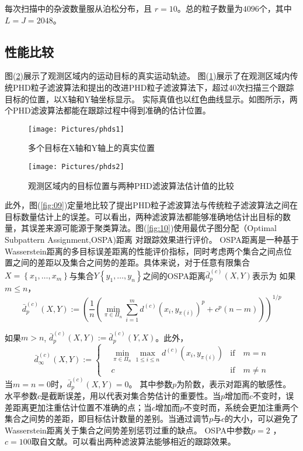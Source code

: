 每次扫描中的杂波数量服从泊松分布，且 $r=10$。总的粒子数量为$4096$个，其中$L=J=2048$。

\subsection{性能比较}
图(\ref{fig:07})展示了观测区域内的运动目标的真实运动轨迹。
图(\ref{fig:06})展示了在观测区域内传统PHD粒子滤波算法和提出的改进PHD粒子滤波算法下，超过40次扫描三个跟踪目标的位置，以X轴和Y轴坐标显示。 实际真值也以红色曲线显示。如图所示，两个PHD滤波算法都能在跟踪过程中得到准确的估计位置。

\begin{figure}[htbp]
	\centering
	\texttt{[image: Pictures/phds1]}
	\caption{多个目标在X轴和Y轴上的真实位置}
	\label{fig:06}
\end{figure}
	
\begin{figure}[htbp]
	\centering
	\texttt{[image: Pictures/phds2]}
	\caption{观测区域内的目标位置与两种PHD滤波算法估计值的比较}
	\label{fig:07}
\end{figure}

此外，图(\ref{fig:09})定量地比较了提出PHD粒子滤波算法与传统粒子滤波算法之间在目标数量估计上的误差。可以看出，两种滤波算法都能够准确地估计出目标的数量，其误差来源可能源于聚类算法。图(\ref{fig:10})使用最优子图分配（Optimal Subpattern Assignment,OSPA)距离\cite{schuhmacher2008consistent} 对跟踪效果进行评价。
OSPA距离是一种基于Wasserstein距离\cite{vallender1974calculation}的多目标误差距离的性能评价指标，同时考虑两个集合之间点位置之间的差距以及集合之间势的差距。具体来说，对于任意有限集合$X=\left\{x_1,\dots,x_m\right\}$与集合$Y\left\{y_1,\dots,y_n\right\}$之间的OSPA距离$\bar{d}^{(c)}_p(X,Y)$表示为
如果$m\leq n$，
\begin{equation}\label{OSPA1}
  \bar{d}^{(c)}_p(X,Y):=\left(\frac{1}{n}\left(\min\limits_{\pi \in \Pi _n}\sum_{i=1}^{m}d^{(c)}(x_i,y_{\pi(i)})^p+c^p(n-m)\right)\right)^{1/p}
\end{equation}

如果$m > n$, $  \bar{d}^{(c)}_p(X,Y):=   \bar{d}^{(c)}_p(Y,X)$。此外，
\begin{equation}\label{OSPA2}
 \bar{d}_{\infty}^{(c)}(X,Y):=\left\{
\begin{aligned}
 & \min\limits_{\pi \in \Pi_n}\max\limits_{1\leq i \leq n}d^{(c)}\left(x_i,y_{\pi(i)}\right) & \text{if} \quad m=n  \\
  & c & \text{if} \quad m\neq n
\end{aligned}\right.
\end{equation}
当$m=n=0$时，$\bar{d}^{(c)}_p(X,Y)=0$。
其中参数$p$为阶数，表示对距离的敏感性。水平参数$c$是截断误差，用以代表对集合势估计的重要性。当$p$增加而$c$不变时，误差距离更加注重估计位置不准确的点；当$c$增加而$p$不变时而，系统会更加注重两个集合之间势的差距，即目标估计数量的差别。当通过调节$p$与$c$的大小，可以避免了Wasserstein距离关于集合之间势差别惩罚过重的缺点。
OSPA中参数$p=2$ ， $c=100$取自文献\cite{shi2013threshold}。可以看出两种滤波算法能够相近的跟踪效果。

